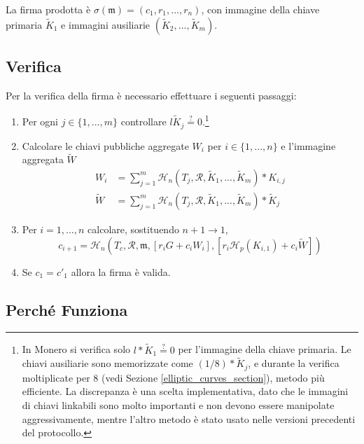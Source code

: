 La firma prodotta è \(\sigma(\mathfrak{m}) = (c_1, r_1, ..., r_n)\), con immagine della chiave primaria \(\tilde{K}_1\) e immagini ausiliarie \((\tilde{K}_2, ..., \tilde{K}_m)\).


\subsection*{Verifica}

Per la verifica della firma è necessario effettuare i seguenti passaggi:

\begin{enumerate}
    \item Per ogni \(j \in \{1,...,m\}\) controllare \(l \tilde{K}_j \stackrel{?}{=} 0\).\footnote{In Monero si verifica solo \(l*\tilde{K}_1 \stackrel{?}{=} 0\) per l'immagine della chiave primaria. Le chiavi ausiliarie sono memorizzate come \((1/8)*\tilde{K}_j\), e durante la verifica moltiplicate per 8 (vedi Sezione \ref{elliptic_curves_section}), metodo più efficiente. La discrepanza è una scelta implementativa, dato che le immagini di chiavi linkabili sono molto importanti e non devono essere manipolate aggressivamente, mentre l'altro metodo è stato usato nelle versioni precedenti del protocollo.}

    \item Calcolare le chiavi pubbliche aggregate \(W_i\) per \(i \in \{1, ..., n\}\) e l'immagine aggregata \(\tilde{W}\)\vspace{.175cm}
    \begin{align*}
    W_i &= \sum^{m}_{j=1} \mathcal{H}_n(T_j, \mathcal{R}, \tilde{K}_1,...,\tilde{K}_m) * K_{i,j}\\
    \tilde{W} &= \sum^{m}_{j=1} \mathcal{H}_n(T_j, \mathcal{R}, \tilde{K}_1,...,\tilde{K}_m) * \tilde{K}_j
    \end{align*}

	\item Per \(i = 1, ..., n\) calcolare, sostituendo \(n+1 \rightarrow 1\),\vspace{.175cm}
	\[c_{i+1} = \mathcal{H}_n(T_c, \mathcal{R}, \mathfrak{m}, [r_i G + c_i W_i], [r_i \mathcal{H}_p(K_{i,1}) + c_i \tilde{W}])\]

	\item Se \(c_1 = c'_1\) allora la firma è valida.
\end{enumerate}


\subsection*{Perché Funziona}

